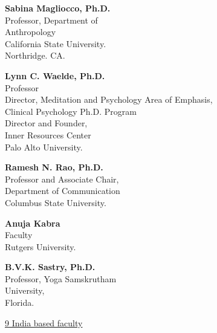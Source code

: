 \begin{multicols}{2}
\begin{trivlist}
\item \textbf{Sabina Magliocco, Ph.D.}\\ 
Professor, Department of\\ Anthropology\\
California State University.\\ Northridge. CA. 
 
\item \textbf{Lynn C. Waelde, Ph.D.}\\ 
Professor\\
Director, Meditation and Psychology Area of Emphasis,\\[2pt] 
Clinical Psychology Ph.D. Program\\[2pt]
Director and Founder,\\ Inner Resources Center\\[2pt]
Palo Alto University.
 
\item \textbf{Ramesh N. Rao, Ph.D.}\\ 
Professor and Associate Chair,\\
Department of Communication\\
Columbus State University.
 
\item \textbf{Anuja Kabra}\\ 
Faculty\\
Rutgers University.
 
\item \textbf{B.V.K. Sastry, Ph.D.}\\ 
Professor, Yoga Samskrutham\\ University,\\ 
Florida. 
\end{trivlist}
\end{multicols}

\newpage

\centerline{\underline{9 India based faculty}} 
\medskip

